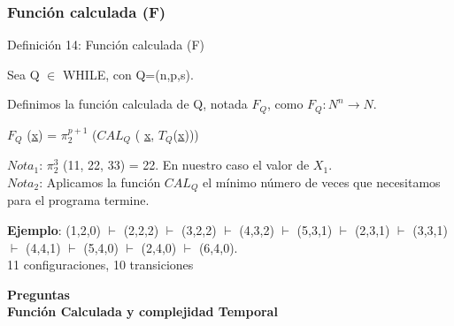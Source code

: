 \documentclass[xcolor=table]{beamer}
\begin{document}
\begin{frame}[fragile]\frametitle{ Función calculada (F) } \footnotesize  


\begin{block}{Definición 14: Función calculada (F)  }
\end{block}

Sea Q $\in$ WHILE, con Q=(n,p,s). 

Definimos la función calculada de Q, notada $F_Q$, como $F_Q: N^{n} \rightarrow N$.

\begin{center}
    $F_Q$ (\underline{x}) = $\pi_2^{p+1}$ ($CAL_Q$ ( \underline{x}, $T_Q$(\underline{x})))
\end{center}


\vspace{0.25cm}            
\scriptsize $Nota_1$: $\pi^{3}_2$ (11, 22, 33) = 22. En nuestro caso el valor de $X_1$.\\
\vspace{0.15cm}  
$Nota_2$: Aplicamos la función $CAL_Q$ el mínimo número de veces que necesitamos para el programa termine.\\
\vspace{0.15cm}  

\textbf{Ejemplo}:  (1,2,0) $\vdash$ (2,2,2) $\vdash$ (3,2,2) $\vdash$ (4,3,2) $\vdash$ (5,3,1) $\vdash$ (2,3,1) $\vdash$ (3,3,1) $\vdash$ (4,4,1) $\vdash$ (5,4,0) $\vdash$ (2,4,0) $\vdash$ (6,4,0). \\ 11 configuraciones, 10 transiciones

\end{frame}


\begin{frame}  \Large

\begin{center}
    \textbf{Preguntas \\
    Función Calculada y complejidad Temporal}
\end{center}

\end{frame} 
\end{document}
